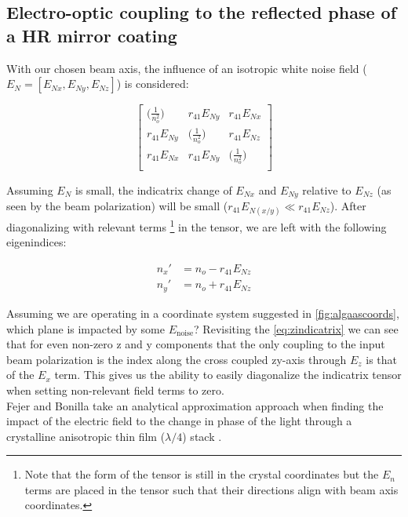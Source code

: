 \subsection{Electro-optic coupling to the reflected phase of a HR mirror coating}
With our chosen beam axis, the influence of an isotropic white noise field ($E_N = [E_{Nx},E_{Ny},E_{Nz}]$) is considered:

\begin{equation}
 \left[ {\begin{array}{ccc}
   \big( \frac{1}{n_o ^2} \big)& r_{41}E_{Ny} & r_{41} E_{Nx}\\
   r_{41}E_{Ny} & \big( \frac{1}{n_o ^2} \big) & r_{41} E_{Nz}\\
   r_{41} E_{Nx} & r_{41} E_{Ny} & \big( \frac{1}{n_o ^2} \big)\\
  \end{array}} \right]
\end{equation}

\noindent Assuming $E_N$ is small, the indicatrix change of $E_{Nx}$ and $E_{Ny}$ relative to $E_{Nz}$ (as seen by the beam polarization) will be small ($r_{41}E_{N(x/y)} \ll r_{41}E_{Nz}$). After diagonalizing with relevant terms \footnote{Note that the form of the tensor is still in the crystal coordinates but the $E_n$ terms are placed in the tensor such that their directions align with beam axis coordinates.} in the tensor, we are left with the following eigenindices:

\begin{equation}
\begin{aligned}
n_x' & = n_o - r_{41}E_{Nz} \\
n_y' & = n_o + r_{41}E_{Nz}
\end{aligned}
\end{equation}


\noindent Assuming we are operating in a coordinate system suggested in \autoref{fig:algaascoords}, which plane is impacted by some $E_\mathrm{noise}$? Revisiting the \autoref{eq:zindicatrix} we can see that for even non-zero z and y components that the only coupling to the input beam polarization is the index along the cross coupled zy-axis through $E_z$ is that of the $E_x$ term. This gives us the ability to easily diagonalize the indicatrix tensor when setting non-relevant field terms to zero.
\\
Fejer and Bonilla take an analytical approximation approach when finding the impact of the electric field to the change in phase of the light through a crystalline anisotropic thin film ($\lambda/4$) stack \cite{bonillafejer}.

